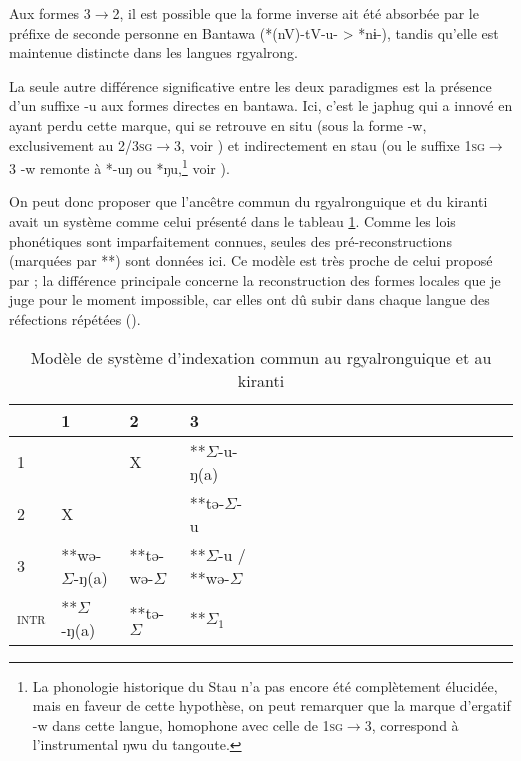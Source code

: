 \documentclass[oldfontcommands,oneside,a4paper,11pt]{article}
\newcommand{\ipa}[1]{{\phon \mbox{#1}}} %
\newcommand{\grise}[1]{\cellcolor{lightgray}\textbf{#1}}
\newcommand{\ra}{$\Sigma_1$}
\newcommand{\ro}{$\Sigma$}
\begin{document}
Aux formes \textsc{3$\rightarrow$2}, il est possible que la forme inverse ait été absorbée par le préfixe de seconde personne en Bantawa (*\ipa{(nV)-tV-u-}  > *\ipa{nɨ-}), tandis qu'elle est maintenue distincte dans les langues rgyalrong. 

La seule autre différence significative entre les deux paradigmes est la présence d'un suffixe \ipa{-u} aux formes directes en bantawa. Ici, c'est le japhug qui a innové en ayant perdu cette marque, qui se retrouve en situ (sous la forme \ipa{-w}, exclusivement au \textsc{2/3sg$\rightarrow$3}, voir \citealt{linyj03tense}) et indirectement en stau (ou le suffixe \textsc{1sg$\rightarrow$3} \ipa{-w} remonte à *\ipa{-uŋ} ou *\ipa{ŋu},\footnote{La phonologie historique du Stau n'a pas encore été complètement élucidée, mais en faveur de cette hypothèse, on peut remarquer que la marque d'ergatif \ipa{-w} dans cette langue, homophone avec celle de \textsc{1sg$\rightarrow$3}, correspond à l'instrumental \ipa{ŋwu} du tangoute. } voir \citealt{jacques14rtau}).

On peut donc proposer que l'ancêtre commun du rgyalronguique et du kiranti avait un système comme celui présenté dans le tableau \ref{tab:commun}. Comme les lois phonétiques sont imparfaitement connues, seules des pré-reconstructions (marquées par **) sont données ici. Ce modèle est très proche de celui proposé par \citet{delancey14second}; la différence principale concerne la reconstruction des formes locales que je juge pour le moment impossible, car elles ont dû subir dans chaque langue des réfections répétées (\citealt{heath98skewing}).  

 

\begin{table}[H]
\caption{Modèle de système d'indexation commun au rgyalronguique et au kiranti} \centering \label{tab:commun}
\begin{tabular}{l|lllllllllllllllllll}
\toprule
&1 & 2 &3 &\\
\midrule
1 &\grise{}& X& **\ro{}-\ipa{u-ŋ(a)}	 \\
2 &X &\grise{} & **\ipa{tə-}\ro{}-\ipa{u}\\
3 &**\ipa{wə-}\ro{}-\ipa{ŋ(a)}&**\ipa{tə-wə-}\ro{}& **\ro{}-\ipa{u} / **\ipa{wə}-\ro{} \\
\midrule
\textsc{intr} & **\ro{}-\ipa{ŋ(a)}&**\ipa{tə-}\ro{}&**\ra{} \\
\bottomrule
\end{tabular}
\end{table}
 
\end{document}

